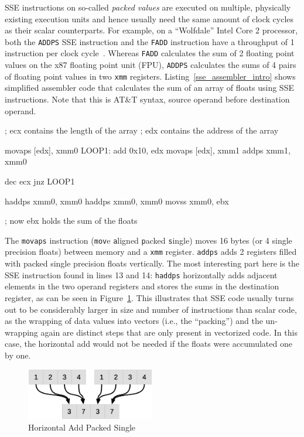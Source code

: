 SSE instructions on so-called \emph{packed values} are executed on multiple, physically existing execution units and hence usually need the same amount of clock cycles as their scalar counterparts. For example, on a ``Wolfdale'' Intel Core 2 processor, both the \texttt{ADDPS} SSE instruction and the \texttt{FADD} instruction have a throughput of 1 instruction per clock cycle~\cite[pp. 50, 57]{fog2011instructiontables}. Whereas \texttt{FADD} calculates the sum of 2 floating point values on the x87 floating point unit (FPU), \texttt{ADDPS} calculates the sums of 4 pairs of floating point values in two \texttt{xmm} registers. Listing~\ref{sse_assembler_intro} shows simplified assembler code that calculates the sum of an array of floats using SSE instructions. Note that this is AT\&T syntax, \ie{}source operand before destination operand.
\begin{assembler}[caption={Array sum using simplified SSE assembly}, label=sse_assembler_intro]
  ; ecx contains the length of the array
  ; edx contains the address of the array

  movaps [edx], xmm0
LOOP1:
  add    0x10, edx
  movaps [edx], xmm1
  addps  xmm1, xmm0

  dec    ecx
  jnz    LOOP1

  haddps xmm0, xmm0
  haddps xmm0, xmm0
  movss  xmm0, ebx

  ; now ebx holds the sum of the floats
\end{assembler}

The \texttt{movaps} instruction (\texttt{mov}e \texttt{a}ligned \texttt{p}acked \texttt{s}ingle) moves 16 bytes (or 4 single precision floats) between memory and a \texttt{xmm} register. \texttt{addps} adds 2 registers filled with packed single precision floats vertically. The most interesting part here is the SSE instruction found in lines 13 and 14: \texttt{haddps} horizontally adds adjacent elements in the two operand registers and stores the sums in the destination register, as can be seen in Figure~\ref{fig:haddps}. This illustrates that SSE code usually turns out to be considerably larger in size and number of instructions than scalar code, as the wrapping of data values into vectors (i.e., the ``packing'') and the un-wrapping again are distinct steps that are only present in vectorized code. In this case, the horizontal add would not be needed if the floats were accumulated one by one.

\begin{figure}[h]
\begin{center}
\includegraphics[width=0.5\textwidth]{img/haddps}
\end{center}
\caption{Horizontal Add Packed Single}
\label{fig:haddps}
\end{figure}

